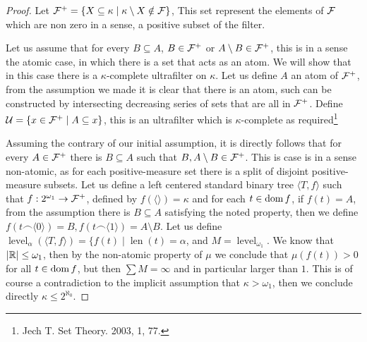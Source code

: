 \begin{proof}
	Let $\mathcal{F}^+ = \{X \subseteq \kappa \mid \kappa \setminus X \notin \mathcal{F}\}$, This set represent the elements of $\mathcal{F}$ which are non zero in a sense, a positive subset of the filter.

	Let us assume that for every $B \subseteq A$, $B \in \mathcal{F}^+$ or $A \setminus B \in \mathcal{F}^+$, this is in a sense the atomic case, in which there is a set that acts as an atom.
	We will show that in this case there is a $\kappa$-complete ultrafilter on $\kappa$.
	Let us define $A$ an atom of $\mathcal{F}^+$, from the assumption we made it is clear that there is an atom, such can be constructed by intersecting decreasing series of sets that are all in $\mathcal{F}^+$.
	Define $\mathcal{U} = \{ x \in \mathcal{F}^+ \mid A \subseteq x \}$, this is an ultrafilter which is $\kappa$-complete as required\footnote{Jech T. Set Theory. 2003, 1, 77.}

	Assuming the contrary of our initial assumption, it is directly follows that for every $A \in \mathcal{F}^+$ there is $B \subseteq A$ such that $B, A \setminus B \in \mathcal{F}^+$.
	This is case is in a sense non-atomic, as for each positive-measure set there is a split of disjoint positive-measure subsets.
	Let us define a left centered standard binary tree $\langle T, f \rangle$ such that $f : 2^{\omega_1} \to \mathcal{F}^+$, defined by $f(\langle \rangle) = \kappa$ and for each $t \in \operatorname{dom} f$,
	if $f(t) = A$, from the assumption there is $B \subseteq A$ satisfying the noted property, then we define $f(t \frown \langle 0 \rangle) = B, f(t \frown \langle 1 \rangle) = A \setminus B$.
	Let us define $\operatorname{level}_\alpha(\langle T, f \rangle) = \{ f(t) \mid \operatorname{len}(t) = \alpha$, and $M = \operatorname{level}_{\omega_1}$.
	We know that $|\mathbb{R}| \le \omega_1$, then by the non-atomic property of $\mu$ we conclude that $\mu(f(t)) > 0$ for all $t \in \operatorname{dom} f$, but then $\sum M = \infty$ and in particular larger than $1$.
	This is of course a contradiction to the implicit assumption that $\kappa > \omega_1$, then we conclude directly $\kappa \le 2^{\aleph_0}$.
\end{proof}


